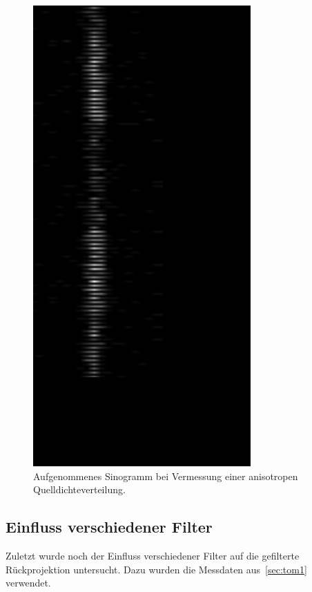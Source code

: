 \documentclass[slug=PET, room=Andreas-Schubert-Bau\,\ 424A, supervisor=Carsten\ Bittrich, coursedate=10.\ 01.\ 2020]{../../Lab_Report_LaTeX/lab_report}
\begin{document}
\begin{figure}[h]
	\centering
	\includegraphics[width=.3\textwidth, angle=90]{../messungen/tom2/tom2_Sinogramm.png}
	\caption{Aufgenommenes Sinogramm bei Vermessung einer anisotropen Quelldichteverteilung.}
	\label{fig:tom2}
\end{figure}

\subsection{Einfluss verschiedener Filter}
\label{sec:filter}

Zuletzt wurde noch der Einfluss verschiedener Filter auf die gefilterte Rückprojektion
untersucht. Dazu wurden die Messdaten aus~\ref{sec:tom1} verwendet.
\end{document}
